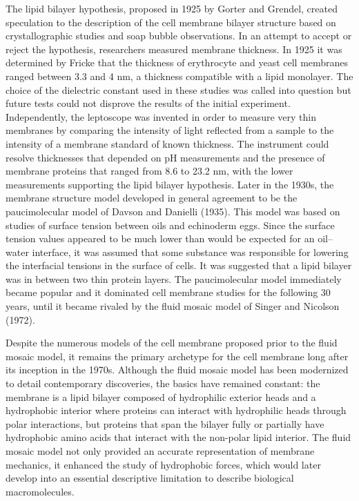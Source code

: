 The lipid bilayer hypothesis, proposed in 1925 by Gorter and Grendel, created speculation to the description of the cell membrane bilayer structure based on crystallographic studies and soap bubble observations. In an attempt to accept or reject the hypothesis, researchers measured membrane thickness. In 1925 it was determined by Fricke that the thickness of erythrocyte and yeast cell membranes ranged between 3.3 and 4 nm, a thickness compatible with a lipid monolayer. The choice of the dielectric constant used in these studies was called into question but future tests could not disprove the results of the initial experiment. Independently, the leptoscope was invented in order to measure very thin membranes by comparing the intensity of light reflected from a sample to the intensity of a membrane standard of known thickness. The instrument could resolve thicknesses that depended on pH measurements and the presence of membrane proteins that ranged from 8.6 to 23.2 nm, with the lower measurements supporting the lipid bilayer hypothesis. Later in the 1930s, the membrane structure model developed in general agreement to be the paucimolecular model of Davson and Danielli (1935). This model was based on studies of surface tension between oils and echinoderm eggs. Since the surface tension values appeared to be much lower than would be expected for an oil--water interface, it was assumed that some substance was responsible for lowering the interfacial tensions in the surface of cells. It was suggested that a lipid bilayer was in between two thin protein layers. The paucimolecular model immediately became popular and it dominated cell membrane studies for the following 30 years, until it became rivaled by the fluid mosaic model of Singer and Nicolson (1972).

Despite the numerous models of the cell membrane proposed prior to the fluid mosaic model, it remains the primary archetype for the cell membrane long after its inception in the 1970s. Although the fluid mosaic model has been modernized to detail contemporary discoveries, the basics have remained constant: the membrane is a lipid bilayer composed of hydrophilic exterior heads and a hydrophobic interior where proteins can interact with hydrophilic heads through polar interactions, but proteins that span the bilayer fully or partially have hydrophobic amino acids that interact with the non-polar lipid interior. The fluid mosaic model not only provided an accurate representation of membrane mechanics, it enhanced the study of hydrophobic forces, which would later develop into an essential descriptive limitation to describe biological macromolecules.

